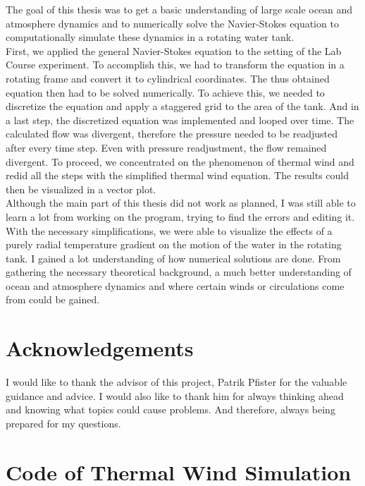 \documentclass[12pt, a4paper]{article} %
\begin{document}
	The goal of this thesis was to get a basic understanding of large scale ocean and atmosphere dynamics and to numerically solve the Navier-Stokes equation to computationally simulate these dynamics in a rotating water tank. \\
	First, we applied the general Navier-Stokes equation to the setting of the Lab Course experiment. To accomplish this, we had to transform the equation in a rotating frame and convert it to cylindrical coordinates. The thus obtained equation then had to be solved numerically. To achieve this, we needed to discretize the equation and apply a staggered grid to the area of the tank. And in a last step, the discretized equation was implemented and looped over time. The calculated flow was divergent, therefore the pressure needed to be readjusted after every time step. Even with pressure readjustment, the flow remained divergent. To proceed, we concentrated on the phenomenon of thermal wind and redid all the steps with the simplified thermal wind equation. The results could then be visualized in a vector plot. \\
		
	Although the main part of this thesis did not work as planned, I was still able to learn a lot from working on the program, trying to find the errors and editing it. With the necessary simplifications, we were able to visualize the effects of a purely radial temperature gradient on the motion of the water in the rotating tank. I gained a lot understanding of how numerical solutions are done. From gathering the necessary theoretical background, a much better understanding of ocean and atmosphere dynamics and where certain winds or circulations come from could be gained.
	
\section{Acknowledgements}
	I  would like to thank the advisor of this project, Patrik Pfister for the valuable guidance and advice. I would also like to thank him for always thinking ahead and knowing what topics could cause problems. And therefore, always being prepared for my questions.
	
	\newpage
	
	
	
	\nocite{*}

	\newpage

\appendix
\section{Code of Thermal Wind Simulation}
	
\end{document}
